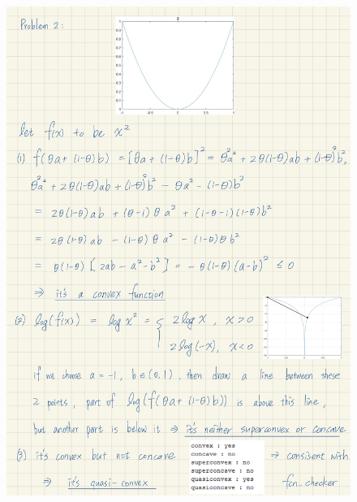 \documentclass[a4paper, onecolumn, , 11pt]{IEEEtran}
\begin{document}
    \begin{figure}
        \centering
        \includegraphics[width=1\textwidth]{proofs/prob2.jpg}
    \end{figure}
\end{document}
